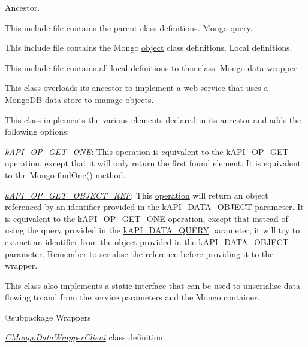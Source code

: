 Ancestor.

This include file contains the parent class definitions. Mongo query.

This include file contains the Mongo \hyperlink{class_c_mongo_query}{object} class definitions. Local definitions.

This include file contains all local definitions to this class. Mongo data wrapper.

This class overloads its \hyperlink{class_c_data_wrapper}{ancestor} to implement a web-\/service that uses a Mongo\-D\-B data store to manage objects.

This class implements the various elements declared in its \hyperlink{class_c_data_wrapper}{ancestor} and adds the following options\-:


\begin{DoxyItemize}
\item {\itshape \hyperlink{}{k\-A\-P\-I\-\_\-\-O\-P\-\_\-\-G\-E\-T\-\_\-\-O\-N\-E}}\-: This \hyperlink{}{operation} is equivalent to the \hyperlink{}{k\-A\-P\-I\-\_\-\-O\-P\-\_\-\-G\-E\-T} operation, except that it will only return the first found element. It is equivalent to the Mongo find\-One() method. 
\item {\itshape \hyperlink{}{k\-A\-P\-I\-\_\-\-O\-P\-\_\-\-G\-E\-T\-\_\-\-O\-B\-J\-E\-C\-T\-\_\-\-R\-E\-F}}\-: This \hyperlink{}{operation} will return an object referenced by an identifier provided in the \hyperlink{}{k\-A\-P\-I\-\_\-\-D\-A\-T\-A\-\_\-\-O\-B\-J\-E\-C\-T} parameter. It is equivalent to the \hyperlink{}{k\-A\-P\-I\-\_\-\-O\-P\-\_\-\-G\-E\-T\-\_\-\-O\-N\-E} operation, except that instead of using the query provided in the \hyperlink{}{k\-A\-P\-I\-\_\-\-D\-A\-T\-A\-\_\-\-Q\-U\-E\-R\-Y} parameter, it will try to extract an identifier from the object provided in the \hyperlink{}{k\-A\-P\-I\-\_\-\-D\-A\-T\-A\-\_\-\-O\-B\-J\-E\-C\-T} parameter. Remember to \hyperlink{class_c_data_type_a608d6fc184bce537ce83669f729d6008}{serialise} the reference before providing it to the wrapper. 
\end{DoxyItemize}

This class also implements a static interface that can be used to \hyperlink{}{unserialise} data flowing to and from the service parameters and the Mongo container.

\begin{DoxyVerb} @subpackage        Wrappers\end{DoxyVerb}


{\itshape \hyperlink{class_c_mongo_data_wrapper_client}{C\-Mongo\-Data\-Wrapper\-Client}} class definition.

